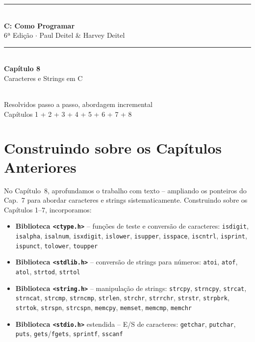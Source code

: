 \documentclass[12pt,a4paper]{article}
\begin{document}
\begin{titlepage}
  \centering\vspace*{2cm}
  {\color{deitelblue}\rule{\linewidth}{2pt}}\\[0.4cm]
  {\huge\bfseries\color{deitelblue}C: Como Programar}\\[0.2cm]
  {\large\color{deitelblue}6ª Edição $\cdot$ Paul Deitel \& Harvey Deitel}\\[0.2cm]
  {\color{deitelblue}\rule{\linewidth}{2pt}}\\[1cm]
  {\LARGE\bfseries Capítulo 8}\\[0.3cm]
  {\Large\color{deitelblue!80}Caracteres e Strings em C}\\[0.8cm]
  \begin{tcolorbox}[colback=deitellightblue,colframe=deitelblue,width=0.85\linewidth]
    \\[0.2cm]
    {\normalsize Resolvidos passo a passo, abordagem incremental\\
    Capítulos 1 + 2 + 3 + 4 + 5 + 6 + 7 + 8}
  \end{tcolorbox}
\end{titlepage}

\section*{Construindo sobre os Capítulos Anteriores}

No Capítulo~8, aprofundamos o trabalho com texto -- ampliando os ponteiros do
Cap.~7 para abordar caracteres e strings sistematicamente. Construindo sobre os
Capítulos 1--7, incorporamos:

\begin{itemize}[noitemsep]
  \item \textbf{Biblioteca \texttt{<ctype.h>}} -- funções de teste e conversão de caracteres:
    \texttt{isdigit}, \texttt{isalpha}, \texttt{isalnum}, \texttt{isxdigit},
    \texttt{islower}, \texttt{isupper}, \texttt{isspace}, \texttt{iscntrl},
    \texttt{isprint}, \texttt{ispunct}, \texttt{tolower}, \texttt{toupper}
  \item \textbf{Biblioteca \texttt{<stdlib.h>}} -- conversão de strings para números:
    \texttt{atoi}, \texttt{atof}, \texttt{atol}, \texttt{strtod}, \texttt{strtol}
  \item \textbf{Biblioteca \texttt{<string.h>}} -- manipulação de strings:
    \texttt{strcpy}, \texttt{strncpy}, \texttt{strcat}, \texttt{strncat},
    \texttt{strcmp}, \texttt{strncmp}, \texttt{strlen}, \texttt{strchr},
    \texttt{strrchr}, \texttt{strstr}, \texttt{strpbrk}, \texttt{strtok},
    \texttt{strspn}, \texttt{strcspn}, \texttt{memcpy}, \texttt{memset},
    \texttt{memcmp}, \texttt{memchr}
  \item \textbf{Biblioteca \texttt{<stdio.h>}} estendida -- E/S de caracteres:
    \texttt{getchar}, \texttt{putchar}, \texttt{puts}, \texttt{gets}/\texttt{fgets},
    \texttt{sprintf}, \texttt{sscanf}
\end{itemize}
\end{document}
